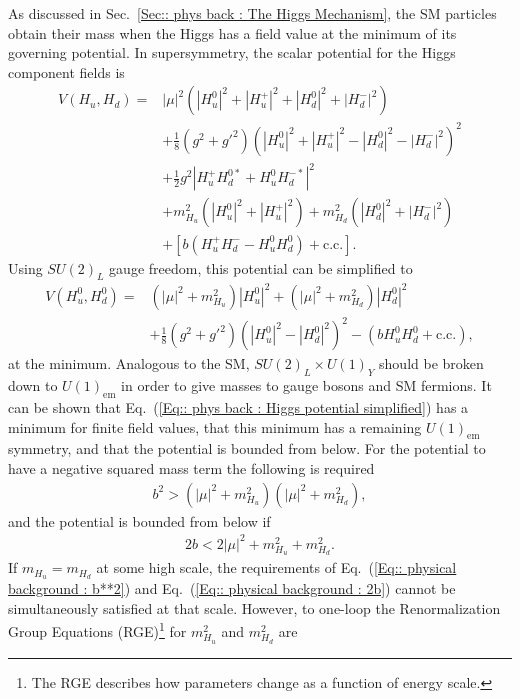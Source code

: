 \documentclass[twoside,english]{uiofysmaster}
\begin{document}
{As discussed in Sec.~\ref{Sec:: phys back : The Higgs Mechanism}, the SM particles obtain their mass when the Higgs has a field value at the minimum of its governing potential. In supersymmetry, the scalar potential for the Higgs component fields is
\begin{align}
V(H_u, H_d) =& |\mu|^2 (|H_u^0|^2 + |H_u^+|^2 + |H_d^0|^2 + |H_d^-|^2) \nonumber \\
&+ \frac{1}{8} (g^2+{g'}^2)(|H_u^0|^2 + |H_u^+|^2 - |H_d^0|^2 - |H_d^-|^2)^2 \nonumber \\
&+ \frac{1}{2} g^2 |H_u^+H_d^{0*} + H_u^0H_d^{-*}|^2 \nonumber \\
&+ m_{H_u}^2 (|H_u^0|^2 + |H_u^+|^2) + m_{H_d}^2 (|H_d^0|^2 + |H_d^-|^2) \nonumber \\
&+ [b (H_u^+H_d^- - H_u^0 H_d^0) + \text{c.c.}].
\end{align}
Using $SU(2)_L$ gauge freedom, this potential can be simplified to 
\begin{align}\label{Eq:: phys back : Higgs potential simplified}
V(H_u^0, H_d^0) =& (|\mu|^2 + m_{H_u}^2) |H_u^0|^2 + (|\mu|^2 + m_{H_d}^2)|H_d^0|^2 \nonumber \\
&+ \frac{1}{8}(g^2 + {g'}^2)(|H_u^0|^2 - |H_d^0|^2)^2 - (bH_u^0 H_d^0 + \text{c.c.}),
\end{align}
at the minimum. Analogous to the SM, $SU(2)_L \times U(1)_Y$ should be broken down to $U(1)_{\mathrm{em}}$ in order to give masses to gauge bosons and SM fermions. It can be shown that Eq.~(\ref{Eq:: phys back : Higgs potential simplified}) has a minimum for finite field values, that this minimum has a remaining $U(1)_{\mathrm{em}}$ symmetry, and that the potential is bounded from below. For the potential to have a negative squared mass term the following is required
\begin{align}\label{Eq:: physical background : b**2}
b^2 > (|\mu|^2 + m_{H_u}^2)(|\mu|^2 + m_{H_d}^2),
\end{align}
and the potential is bounded from below if
\begin{align}\label{Eq:: physical background : 2b}
2b < 2 |\mu|^2 + m_{H_u}^2 + m^2_{H_d}.
\end{align}
If $m_{H_u} = m_{H_d}$ at some high scale,  the requirements of Eq.~(\ref{Eq:: physical background : b**2}) and Eq.~(\ref{Eq:: physical background : 2b}) cannot be simultaneously satisfied at that scale. However, to one-loop the Renormalization Group Equations (RGE)\footnote{The RGE describes how parameters change as a function of energy scale.} for $m_{H_u}^2$ and $m_{H_d}^2$ are 
}
\end{document}
